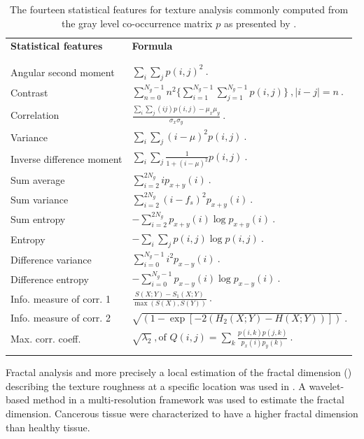 \begin{enumerate}[leftmargin=*]
\begin{table}
	\caption{The fourteen statistical features for texture analysis commonly computed from the gray level co-occurrence matrix $p$ as presented by \cite{Haralick1973}.}
	\small
	\renewcommand{\arraystretch}{1.5}
	\begin{tabular}{p{.4\linewidth} p{.6\linewidth}}
		\hline %
		\textbf{Statistical features} & \textbf{Formula} \\ \\ [-3ex]
		\hline \\ [-1.5ex]
		Angular second moment & $\sum_i \sum_j p(i,j)^2 \ .$  \\
		Contrast & $\sum_{n=0}^{N_g - 1} n^2 \{ \sum_{i=1}^{N_g - 1} \sum_{j=1}^{N_g - 1} p(i,j) \} \ , | i-j |=n \ . $ \\
		Correlation & $\frac{\sum_i \sum_j (ij) p(i,j) - \mu_x \mu_y}{\sigma_x \sigma_y} \ . $ \\
		Variance & $\sum_i \sum_j (i - \mu)^2 p(i,j) \ . $ \\
		Inverse difference moment & $\sum_i \sum_j \frac{1}{1+(i - \mu)^2} p(i,j) \ . $ \\
		Sum average & $\sum_{i=2}^{2N_g} i p_{x+y}(i) \ . $ \\
		Sum variance & $\sum_{i=2}^{2N_g} (i-f_s)^2 p_{x+y}(i) \ . $ \\
		Sum entropy & $ - \sum_{i=2}^{2N_g} p_{x+y}(i) \log p_{x+y}(i) \ . $ \\
		Entropy & $ - \sum_i \sum_j p(i,j) \log p(i,j) \ .$ \\
		Difference variance & $\sum_{i=0}^{N_g-1} i^2 p_{x-y}(i) \ . $ \\
		Difference entropy & $ - \sum_{i=0}^{N_g-1} p_{x-y}(i) \log p_{x-y}(i) \ . $ \\
		Info. measure of corr. 1 & $\frac{S(X;Y)-S_1(X;Y)}{\max(S(X),S(Y))} \ . $ \\
		Info. measure of corr. 2 & $\sqrt{\left( 1 - \exp \left[ -2( H_2(X;Y) - H(X;Y) ) \right] \right)} \ . $ \\
		Max. corr. coeff. & $ \sqrt{\lambda_2} \ , \text{of } Q(i,j) = \sum_k \frac{p(i,k)p(j,k)}{p_x(i)p_y(k)} \ . $ \\
		\\ [-3ex] \hline
	\end{tabular}
	\label{tab:glcm}
\end{table}

Fractal analysis and more precisely a local estimation of the fractal dimension (\cite{Benassi1998}) describing the texture roughness at a specific location was used in \cite{Lopes2011}. A wavelet-based method in a multi-resolution framework was used to estimate the fractal dimension. Cancerous tissue were characterized to have a higher fractal dimension than healthy tissue.


\end{enumerate}
